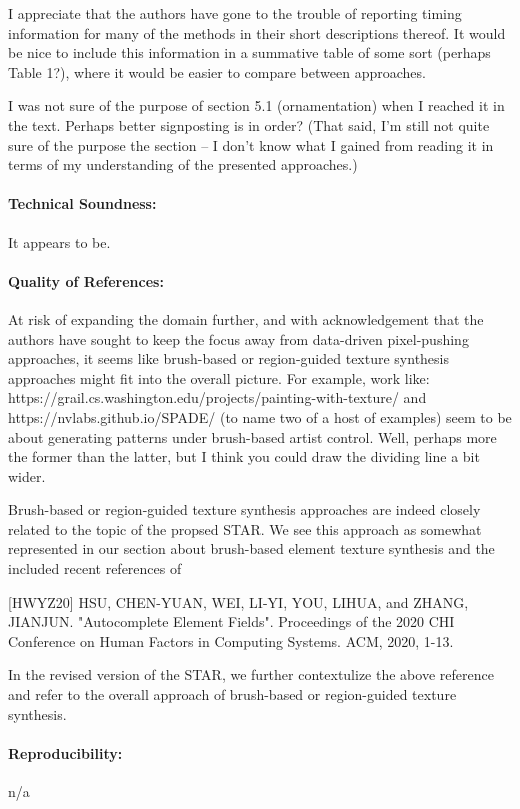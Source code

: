 \documentclass{egpubl}
\newcommand{\rev}[2]{{\color{greenrev}\textsuperscript{#1}#2}}
\renewcommand{\rev}[2]{{#2}}
\begin{document}
I appreciate that the authors have gone to the trouble of reporting timing information for many of the methods in their short descriptions thereof. It would be nice to include this information in a summative table of some sort (perhaps Table 1?), where it would be easier to compare between approaches.

I was not sure of the purpose of section 5.1 (ornamentation) when I reached it in the text. Perhaps better signposting is in order? (That said, I'm still not quite sure of the purpose the section -- I don't know what I gained from reading it in terms of my understanding of the presented approaches.)
\paragraph*{Technical Soundness:} It appears to be.
\paragraph*{Quality of References:} At risk of expanding the domain further, and with acknowledgement that the authors have sought to keep the focus away from data-driven pixel-pushing approaches,  it seems like brush-based or region-guided texture synthesis approaches might fit into the overall picture. For example, work like:
https://grail.cs.washington.edu/projects/painting-with-texture/
and https://nvlabs.github.io/SPADE/
(to name two of a host of examples)
seem to be about generating patterns under brush-based artist control. Well, perhaps more the former than the latter, but I think you could draw the dividing line a bit wider.

\rev{Comment}{
    Brush-based or region-guided texture synthesis approaches are indeed closely related to the topic of the propsed STAR. We see this approach as somewhat represented in our section about brush-based element texture synthesis and the included recent references of 

    [HWYZ20]  HSU, CHEN-YUAN, WEI, LI-YI, YOU, LIHUA, and ZHANG, JIANJUN. "Autocomplete Element Fields". Proceedings of the 2020 CHI Conference on Human Factors in Computing Systems. ACM, 2020, 1-13.

    In the revised version of the STAR, we further contextulize the above reference and refer to the overall approach of brush-based or region-guided texture synthesis.
}

\paragraph*{Reproducibility:} n/a
\end{document}
